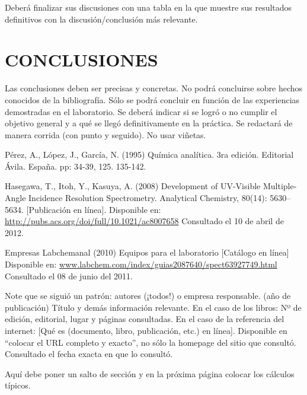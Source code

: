 \documentclass[12pt,letterpaper,twocolumn,twoside]{article}
\begin{document}
Deberá finalizar sus discusiones con una tabla en la que muestre sus resultados definitivos con la discusión/conclusión más relevante.



\section*{CONCLUSIONES}
Las conclusiones deben ser precisas y concretas. No podrá concluirse sobre hechos conocidos de la bibliografía. Sólo se podrá concluir en función de las experiencias demostradas en el laboratorio. Se deberá indicar si se logró o no cumplir el objetivo general y a qué se llegó definitivamente en la práctica. Se redactará de manera corrida (con punto y seguido). No usar viñetas.

\renewcommand{\refname}{REFERENCIAS}
\begin{thebibliography}{5}



Pérez, A., López, J., García, N. (1995) Química analítica. 3ra edición. Editorial Ávila. España. pp: 34-39, 125. 135-142.

Hasegawa, T., Itoh, Y., Kasuya, A. (2008) Development of UV-Visible Multiple-Angle Incidence Resolution Spectrometry. Analytical Chemistry, 80(14): 5630–5634. [Publicación en línea]. Disponible en:
\url{http://pubs.acs.org/doi/full/10.1021/ac8007658} Consultado el 10 de abril de 2012.

Empresas Labchemanal (2010) Equipos para el laboratorio [Catálogo en línea] Disponible en: \url{www.labchem.com/index/guias2087640/spect63927749.html} Consultado el 08 de junio del 2011.

\end{thebibliography}

Note que se siguió un patrón: autores (¡todos!) o empresa responsable. (año de publicación) Título y demás información relevante. En el caso de los libros: Nº de edición, editorial, lugar y páginas consultadas. En el caso de la referencia del internet: [Qué es (documento, libro, publicación, etc.) en línea]. Disponible en ``colocar el URL completo y exacto'', no sólo la homepage del sitio que consultó. Consultado el fecha exacta en que lo consultó.

Aquí debe poner un salto de sección y en la próxima página colocar los cálculos típicos.

\newpage

\end{document}
